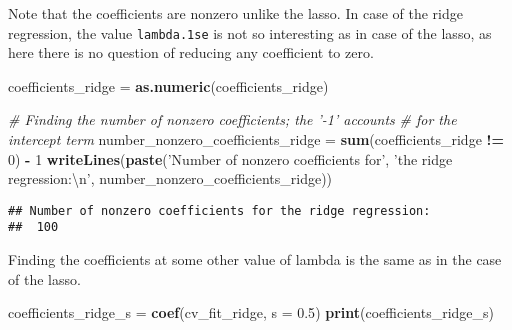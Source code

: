 \documentclass[
]{book}
\newenvironment{Shaded}{\begin{snugshade}}{\end{snugshade}}
\newcommand{\CharTok}[1]{\textcolor[rgb]{0.31,0.60,0.02}{#1}}
\newcommand{\CommentTok}[1]{\textcolor[rgb]{0.56,0.35,0.01}{\textit{#1}}}
\newcommand{\DataTypeTok}[1]{\textcolor[rgb]{0.13,0.29,0.53}{#1}}
\newcommand{\DecValTok}[1]{\textcolor[rgb]{0.00,0.00,0.81}{#1}}
\newcommand{\FloatTok}[1]{\textcolor[rgb]{0.00,0.00,0.81}{#1}}
\newcommand{\KeywordTok}[1]{\textcolor[rgb]{0.13,0.29,0.53}{\textbf{#1}}}
\newcommand{\NormalTok}[1]{#1}
\newcommand{\OperatorTok}[1]{\textcolor[rgb]{0.81,0.36,0.00}{\textbf{#1}}}
\newcommand{\StringTok}[1]{\textcolor[rgb]{0.31,0.60,0.02}{#1}}
\begin{document}
Note that the coefficients are nonzero unlike the lasso. In case of the ridge regression, the value \texttt{lambda.1se} is not so interesting as in case of the lasso, as here there is no question of reducing any coefficient to zero.

\begin{Shaded}
\begin{Highlighting}[]
\NormalTok{coefficients_ridge =}\StringTok{ }\KeywordTok{as.numeric}\NormalTok{(coefficients_ridge)}

\CommentTok{# Finding the number of nonzero coefficients; the '-1' accounts}
\CommentTok{# for the intercept term}
\NormalTok{number_nonzero_coefficients_ridge =}
\StringTok{  }\KeywordTok{sum}\NormalTok{(coefficients_ridge }\OperatorTok{!=}\StringTok{ }\DecValTok{0}\NormalTok{) }\OperatorTok{-}\StringTok{ }\DecValTok{1}
\KeywordTok{writeLines}\NormalTok{(}\KeywordTok{paste}\NormalTok{(}\StringTok{'Number of nonzero coefficients for'}\NormalTok{,}
                 \StringTok{'the ridge regression:}\CharTok{\textbackslash{}n}\StringTok{'}\NormalTok{,}
\NormalTok{                 number_nonzero_coefficients_ridge))}
\end{Highlighting}
\end{Shaded}

\begin{verbatim}
## Number of nonzero coefficients for the ridge regression:
##  100
\end{verbatim}

Finding the coefficients at some other value of lambda is the same as in the case of the lasso.

\begin{Shaded}
\begin{Highlighting}[]
\NormalTok{coefficients_ridge_s =}\StringTok{ }\KeywordTok{coef}\NormalTok{(cv_fit_ridge, }\DataTypeTok{s =} \FloatTok{0.5}\NormalTok{)}
\KeywordTok{print}\NormalTok{(coefficients_ridge_s)}
\end{Highlighting}
\end{Shaded}
\end{document}
